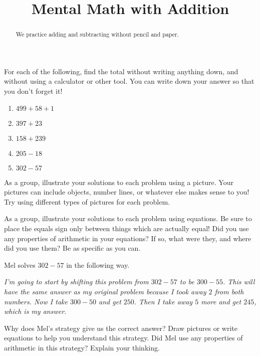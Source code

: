\documentclass{ximera}
\title{Mental Math with Addition}
\begin{document}
\begin{abstract} We practice adding and subtracting without pencil and paper. \end{abstract}
\maketitle


\begin{problem}
For each of the following, find the total without writing anything down, and without using a calculator or other tool. You can write down your answer so that you don't forget it!

\begin{enumerate}
\item $499 + 58 + 1$
\item $397 + 23$
\item $158 + 239$
\item $205 - 18$
\item $302 - 57$
\end{enumerate}

\end{problem}




\begin{problem}
As a group, illustrate your solutions to each problem using a picture. Your pictures can include objects, number lines, or whatever else makes sense to you! Try using different types of pictures for each problem.
\end{problem}


\begin{problem}
As a group, illustrate your solutions to each problem using equations. Be sure to place the equals sign only between things which are actually equal! Did you use any properties of arithmetic in your equations? If so, what were they, and where did you use them? Be as specific as you can.

\end{problem}


\begin{problem}
Mel solves $302 - 57$ in the following way.

\emph{I'm going to start by shifting this problem from $302 - 57$ to be $300 - 55$. This will have the same answer as my original problem because I took away $2$ from both numbers. Now I take $300 - 50$ and get $250$. Then I take away $5$ more and get $245$, which is my answer.}

Why does Mel's strategy give us the correct answer? Draw pictures or write equations to help you understand this strategy. Did Mel use any properties of arithmetic in this strategy?  Explain your thinking.
\end{problem}
\end{document}

